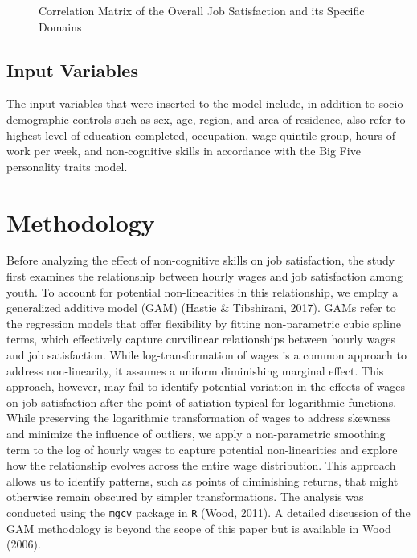 \documentclass[
]{interact}
\begin{document}
\begin{figure}


\caption{\label{fig-corr-jobsatisf}Correlation Matrix of the Overall Job
Satisfaction and its Specific Domains}

\end{figure}%

\subsection{Input Variables}\label{input-variables}

The input variables that were inserted to the model include, in addition
to socio-demographic controls such as sex, age, region, and area of
residence, also refer to highest level of education completed,
occupation, wage quintile group, hours of work per week, and
non-cognitive skills in accordance with the Big Five personality traits
model.

\section{Methodology}\label{methodology}

Before analyzing the effect of non-cognitive skills on job satisfaction,
the study first examines the relationship between hourly wages and job
satisfaction among youth. To account for potential non-linearities in
this relationship, we employ a generalized additive model (GAM) (Hastie
\& Tibshirani, 2017). GAMs refer to the regression models that offer
flexibility by fitting non-parametric cubic spline terms, which
effectively capture curvilinear relationships between hourly wages and
job satisfaction. While log-transformation of wages is a common approach
to address non-linearity, it assumes a uniform diminishing marginal
effect. This approach, however, may fail to identify potential variation
in the effects of wages on job satisfaction after the point of satiation
typical for logarithmic functions. While preserving the logarithmic
transformation of wages to address skewness and minimize the influence
of outliers, we apply a non-parametric smoothing term to the log of
hourly wages to capture potential non-linearities and explore how the
relationship evolves across the entire wage distribution. This approach
allows us to identify patterns, such as points of diminishing returns,
that might otherwise remain obscured by simpler transformations. The
analysis was conducted using the \texttt{mgcv} package in \texttt{R}
(Wood, 2011). A detailed discussion of the GAM methodology is beyond the
scope of this paper but is available in Wood (2006).
\end{document}
